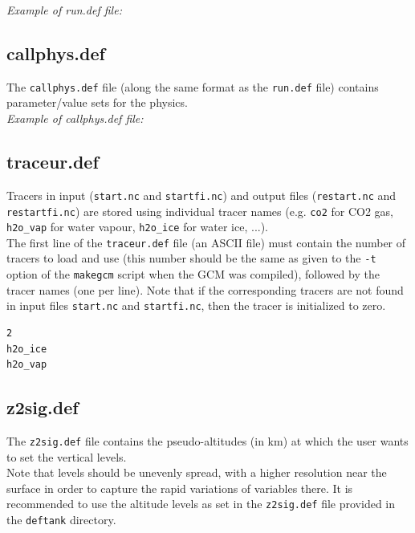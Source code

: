 \noindent
{\it Example of run.def file: }



\subsection{callphys.def}
\label{sc:callphys.def}
The {\tt callphys.def} file (along the same format
as the {\tt run.def} file) contains parameter/value sets
for the physics.\\


\noindent
{\it Example of callphys.def file: }


\subsection{traceur.def}
\label{sc:traceur.def}
Tracers in input ({\tt start.nc} and {\tt startfi.nc}) and output
files ({\tt restart.nc} and {\tt restartfi.nc}) are stored using
individual tracer names (e.g. {\tt co2} for CO2 gas, {\tt h2o\_vap}
for water vapour, {\tt h2o\_ice} for water ice, ...).\\
The first line of the {\tt traceur.def} file (an ASCII file) must
contain the number of tracers to load and use (this number should
be the same as given to the {\tt -t} option of the {\tt makegcm}
script when the GCM was compiled), followed by the tracer names
(one per line). Note that if the corresponding tracers are not
found in input files {\tt start.nc} and {\tt startfi.nc}, then the
tracer is initialized to zero.\\


{\footnotesize
\begin{verbatim}
2
h2o_ice
h2o_vap
\end{verbatim}
}

\subsection{z2sig.def}
The {\tt z2sig.def} file contains the pseudo-altitudes
(in km) at which the user wants to set the vertical levels.\\
Note that levels should be unevenly spread, with a higher resolution
near the surface in order to capture the rapid variations of variables
there. It is recommended to use the altitude levels as set in the
{\tt z2sig.def} file provided in the {\tt deftank} directory.\\

